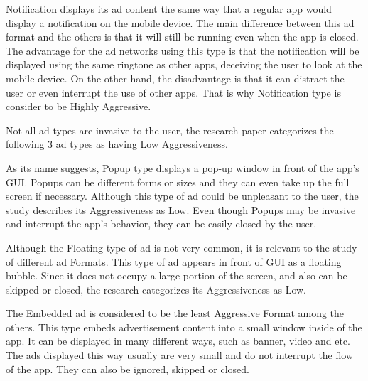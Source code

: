 \documentclass[conference]{IEEEtran}
\begin{document}
Notification displays its ad content the same way that a regular app would display a notification on the mobile device. The main difference between this ad format and the others is that it will still be running even when the app is closed. The advantage for the ad networks using this type is that the notification will be displayed using the same ringtone as other apps, deceiving the user to look at the mobile device. On the other hand, the disadvantage is that it can distract the user or even interrupt the use of other apps. That is why Notification type is consider to be Highly Aggressive.

Not all ad types are invasive to the user, the research paper categorizes the following 3 ad types as having Low Aggressiveness.

As its name suggests, Popup type displays a pop-up window in front of the app’s GUI. Popups can be different forms or sizes and they can even take up the full screen if necessary. Although this type of ad could be unpleasant to the user, the study describes its Aggressiveness as Low. Even though Popups may be invasive and interrupt the app’s behavior, they can be easily closed by the user. 

Although the Floating type of ad is not very common, it is relevant to the study of different ad Formats. This type of ad appears in front of GUI as a floating bubble. Since it does not occupy a large portion of the screen, and also can be skipped or closed, the research categorizes its Aggressiveness as Low. 

The Embedded ad is considered to be the least Aggressive Format among the others. This type embeds advertisement content into a small window inside of the app. It can be displayed in many different ways, such as banner, video and etc. The ads displayed this way usually are very small and do not interrupt the flow of the app. They can also be ignored, skipped or closed.
\end{document}
